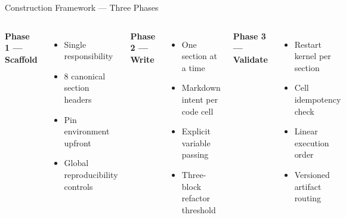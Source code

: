 \documentclass[11pt, aspectratio=169]{beamer}
\begin{document}
\begin{frame}{Construction Framework --- Three Phases}
  \centering
  \vspace{-0.3cm}

  \vspace{0.1cm}
  \begin{columns}[T]
      \textbf{Phase 1 --- Scaffold}
      \begin{itemize}\scriptsize
        \item Single responsibility
        \item 8 canonical section headers
        \item Pin environment upfront
        \item Global reproducibility controls
      \end{itemize}

      \textbf{Phase 2 --- Write}
      \begin{itemize}\scriptsize
        \item One section at a time
        \item Markdown intent per code cell
        \item Explicit variable passing
        \item Three-block refactor threshold
      \end{itemize}

      \textbf{Phase 3 --- Validate}
      \begin{itemize}\scriptsize
        \item Restart kernel per section
        \item Cell idempotency check
        \item Linear execution order
        \item Versioned artifact routing
      \end{itemize}
  \end{columns}
\end{frame}
\end{document}
